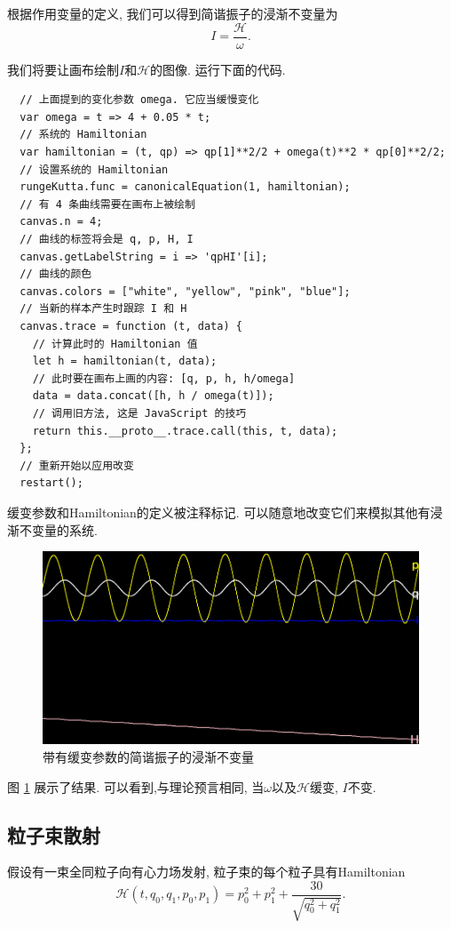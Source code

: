 \documentclass[12pt]{article}
\begin{document}
根据作用变量的定义,
我们可以得到简谐振子的浸渐不变量为\cite[p. 300]{arnold1989mathmech}\cite[p. 157]{landau1976mechanics}
\begin{equation*}
  I=\frac{\mathcal H}\omega.
\end{equation*}

我们将要让画布绘制$I$和$\mathcal H$的图像.
运行下面的代码.

\begin{verbatim}
  // 上面提到的变化参数 omega. 它应当缓慢变化
  var omega = t => 4 + 0.05 * t;
  // 系统的 Hamiltonian
  var hamiltonian = (t, qp) => qp[1]**2/2 + omega(t)**2 * qp[0]**2/2;
  // 设置系统的 Hamiltonian
  rungeKutta.func = canonicalEquation(1, hamiltonian);
  // 有 4 条曲线需要在画布上被绘制
  canvas.n = 4;
  // 曲线的标签将会是 q, p, H, I
  canvas.getLabelString = i => 'qpHI'[i];
  // 曲线的颜色
  canvas.colors = ["white", "yellow", "pink", "blue"];
  // 当新的样本产生时跟踪 I 和 H
  canvas.trace = function (t, data) {
    // 计算此时的 Hamiltonian 值
    let h = hamiltonian(t, data);
    // 此时要在画布上画的内容: [q, p, h, h/omega]
    data = data.concat([h, h / omega(t)]);
    // 调用旧方法, 这是 JavaScript 的技巧
    return this.__proto__.trace.call(this, t, data);
  };
  // 重新开始以应用改变
  restart();
\end{verbatim}

缓变参数和Hamiltonian的定义被注释标记.
可以随意地改变它们来模拟其他有浸渐不变量的系统.

\begin{figure}[h]
  \centering
  \includegraphics[width=0.6\linewidth]{adiabatic.png}
  \caption{带有缓变参数的简谐振子的浸渐不变量}
  \label{fig:adiabatic}
\end{figure}

图 \ref{fig:adiabatic} 展示了结果.
可以看到,与理论预言相同,
当$\omega$以及$\mathcal H$缓变, $I$不变.

\subsection{粒子束散射}

假设有一束全同粒子向有心力场发射,
粒子束的每个粒子具有Hamiltonian
\begin{equation*}
  \mathcal H\left(t,q_0,q_1,p_0,p_1\right)=p_0^2+p_1^2+\frac{30}{\sqrt{q_0^2+q_1^2}}.
\end{equation*}
\end{document}
